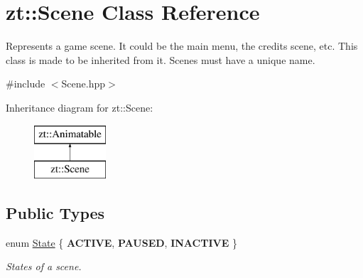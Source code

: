 \hypertarget{classzt_1_1_scene}{}\section{zt\+:\+:Scene Class Reference}
\label{classzt_1_1_scene}


Represents a game scene. It could be the main menu, the credits scene, etc. This class is made to be inherited from it. Scenes must have a unique name.  




{\ttfamily \#include $<$Scene.\+hpp$>$}

Inheritance diagram for zt\+:\+:Scene\+:\begin{figure}[H]
\begin{center}
\leavevmode
\includegraphics[height=2.000000cm]{classzt_1_1_scene}
\end{center}
\end{figure}
\subsection*{Public Types}
\begin{DoxyCompactItemize}
\item 
\mbox{\label{classzt_1_1_scene_a5618d9448cd874af20a6be8ed60c87a5}} 
enum \hyperlink{classzt_1_1_scene_a5618d9448cd874af20a6be8ed60c87a5}{State} \{ {\bfseries A\+C\+T\+I\+VE}, 
{\bfseries P\+A\+U\+S\+ED}, 
{\bfseries I\+N\+A\+C\+T\+I\+VE}
 \}\begin{DoxyCompactList}\small\item\em States of a scene. \end{DoxyCompactList}
\end{DoxyCompactItemize}
